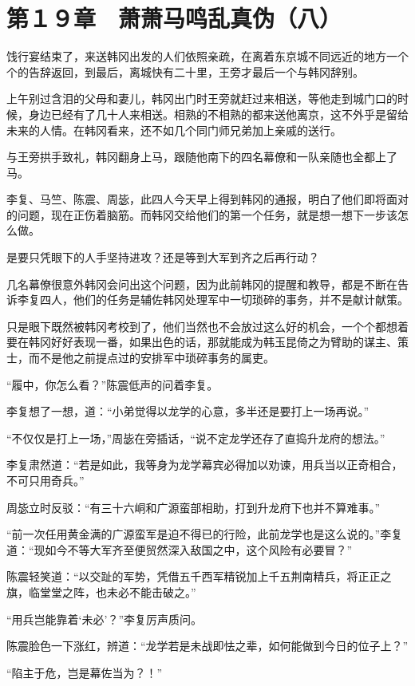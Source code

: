\section{第１９章　萧萧马鸣乱真伪（八）}

饯行宴结束了，来送韩冈出发的人们依照亲疏，在离着东京城不同远近的地方一个个的告辞返回，到最后，离城快有二十里，王旁才最后一个与韩冈辞别。

上午别过含泪的父母和妻儿，韩冈出门时王旁就赶过来相送，等他走到城门口的时候，身边已经有了几十人来相送。相熟的不相熟的都来送他离京，这不外乎是留给未来的人情。在韩冈看来，还不如几个同门师兄弟加上亲戚的送行。

与王旁拱手致礼，韩冈翻身上马，跟随他南下的四名幕僚和一队亲随也全都上了马。

李复、马竺、陈震、周毖，此四人今天早上得到韩冈的通报，明白了他们即将面对的问题，现在正伤着脑筋。而韩冈交给他们的第一个任务，就是想一想下一步该怎么做。

是要只凭眼下的人手坚持进攻？还是等到大军到齐之后再行动？

几名幕僚很意外韩冈会问出这个问题，因为此前韩冈的提醒和教导，都是不断在告诉李复四人，他们的任务是辅佐韩冈处理军中一切琐碎的事务，并不是献计献策。

只是眼下既然被韩冈考校到了，他们当然也不会放过这么好的机会，一个个都想着要在韩冈好好表现一番，如果出色的话，那就能成为韩玉昆倚之为臂助的谋主、策士，而不是他之前提点过的安排军中琐碎事务的属吏。

“履中，你怎么看？”陈震低声的问着李复。

李复想了一想，道：“小弟觉得以龙学的心意，多半还是要打上一场再说。”

“不仅仅是打上一场，”周毖在旁插话，“说不定龙学还存了直捣升龙府的想法。”

李复肃然道：“若是如此，我等身为龙学幕宾必得加以劝谏，用兵当以正奇相合，不可只用奇兵。”

周毖立时反驳：“有三十六峒和广源蛮部相助，打到升龙府下也并不算难事。”

“前一次任用黄金满的广源蛮军是迫不得已的行险，此前龙学也是这么说的。”李复道：“现如今不等大军齐至便贸然深入敌国之中，这个风险有必要冒？”

陈震轻笑道：“以交趾的军势，凭借五千西军精锐加上千五荆南精兵，将正正之旗，临堂堂之阵，也未必不能击破之。”

“用兵岂能靠着‘未必’？”李复厉声质问。

陈震脸色一下涨红，辨道：“龙学若是未战即怯之辈，如何能做到今日的位子上？”

“陷主于危，岂是幕佐当为？！”

